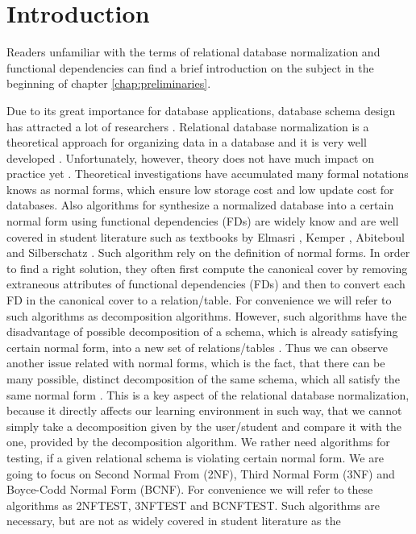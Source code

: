 \chapter{Introduction}
\label{chap:introduction}
Readers unfamiliar with the terms of relational database normalization and 
functional dependencies can find a brief introduction on the subject in the beginning of
chapter \ref{chap:preliminaries}. 

Due to its great importance for database applications, database schema design has
attracted a lot of researchers \cite{p1}. Relational database normalization is a 
theoretical approach for organizing data in a database and it is very well developed \cite{p8}.
Unfortunately, however, theory does not have much impact on practice yet \cite{p1}. 
Theoretical investigations have accumulated many formal
notations knows as normal forms, which ensure low storage cost and low update cost
for databases.
Also algorithms for synthesize a normalized database into a certain normal form using 
functional dependencies (FDs) are widely know 
and are well covered in student literature such as textbooks by Elmasri \cite{bdb1}, 
Kemper \cite{bdb2}, Abiteboul \cite{bdb3} and Silberschatz \cite{bdb4}.
Such algorithm rely on the definition of normal forms. In order to find a right 
solution, they often first compute the canonical cover by removing extraneous 
attributes of functional dependencies (FDs) and then to convert each FD in the 
canonical cover to a relation/table. For convenience we will refer to such algorithms as
decomposition algorithms. However, such algorithms have the 
disadvantage of possible decomposition of a schema, which is already satisfying 
certain normal form, into a new set of relations/tables \cite{p4}. Thus we can observe 
another issue related with normal forms, which is the fact, that there can be many 
possible, distinct decomposition of the same schema, which all satisfy the same 
normal form \cite{bdb4}. 
This is a key aspect of the relational database normalization, because it directly 
affects our learning environment in such way, that we cannot simply take a decomposition given 
by the user/student and compare it with the one, provided by the decomposition algorithm. 
We rather need algorithms for testing, if a given relational schema is violating 
certain normal form. We are going to focus on Second Normal From (2NF), 
Third Normal Form (3NF) and Boyce-Codd Normal Form (BCNF). For convenience we 
will refer to these algorithms as 2NFTEST, 3NFTEST and BCNFTEST. Such algorithms 
are necessary, but are not as widely covered in student literature as the 
